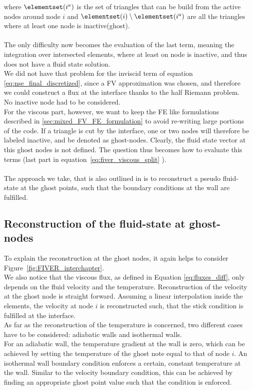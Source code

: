\documentclass[../main.tex]{subfiles}
\begin{document}
where $\elementset(i^a)$ is the set of triangles that can be build from the active nodes around node $i$ and $\elementset(i)\setminus\elementset(i^a)$ are all the triangles where at least one node is inactive(ghost).\\
\\
The only difficulty now becomes the evaluation of the last term, meaning the integration over intersected elements, where at least on node is inactive, and thus does not have a fluid state solution.\\
We did not have that problem for the inviscid term of equation \eqref{eq:nse_final_discretized}, since a \ac{FV} approximation was chosen, and therefore we could construct a flux at the interface thanks to the half Riemann problem. No inactive node had to be considered.\\
For the viscous part, however, we want to keep the \ac{FE} like formulations described in \ref{sec:mixed_FV_FE_formulation} to avoid re-writing large portions of the code. If a triangle is cut by the interface, one or two nodes will therefore be labeled inactive, and be denoted as ghost-nodes.
Clearly, the fluid state vector at this ghost nodes is not defined. The question thus becomes how to evaluate this terms (last part in equation~\eqref{eq:fiver_viscous_split} ).\\
\\
The approach we take, that is also outlined in \cite{Farhat2014} is to reconstruct a pseudo fluid-state at the ghost points, such that the boundary conditions at the wall are fulfilled.

\subsection{Reconstruction of the fluid-state at ghost-nodes}\label{sec:ghost_node_reconstruction}

To explain the reconstruction at the ghost nodes, it again helps to consider Figure~\ref{fig:FIVER_interchapter}.\\
We also notice that the viscous flux, as defined in Equation \ref{eq:fluxes_diff}, only depends on the fluid velocity and the temperature.
Reconstruction of the velocity at the ghost node is straight forward. Assuming a linear interpolation inside the elements, the velocity at node $i$ is reconstructed such, that the stick condition is fulfilled at the interface.\\
As far as the reconstruction of the temperature is concerned, two different cases have to be considered: adiabatic walls and isothermal walls.\\
For an adiabatic wall, the temperature gradient at the wall is zero, which can be achieved by setting the temperature of the ghost note equal to that of node $i$. An isothermal wall boundary condition enforces a certain, constant temperature at the wall. Similar to the velocity boundary condition, this can be achieved by finding an appropriate ghost point value such that the condition is enforced.\\
\end{document}

